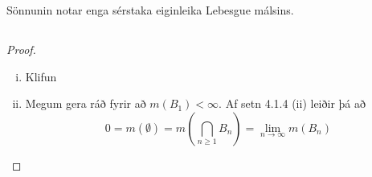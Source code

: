\documentclass[12pt]{book} \usepackage[utf8]{inputenc}
\begin{document}
\begin{ath}
  Sönnunin notar enga sérstaka eiginleika Lebesgue málsins.
\end{ath}

\subsection{}

\begin{proof}
  \begin{enumerate}[(i)]
  \item Klifun
  \item Megum gera ráð fyrir að $m(B_1) < \infty$. Af setn 4.1.4 (ii)
    leiðir þá að
    \[ 0 = m(\emptyset) = m(\bigcap_{n \geq 1} B_n) = \lim_{n \to
      \infty} m(B_n) \]
  \end{enumerate}
\end{proof}
\end{document}
